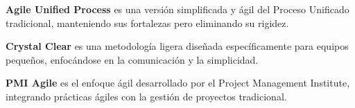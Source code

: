     \textbf{Agile Unified Process} es una versión simplificada y ágil del Proceso Unificado tradicional, manteniendo sus fortalezas pero eliminando su rigidez.

    \textbf{Crystal Clear} es una metodología ligera diseñada específicamente para equipos pequeños, enfocándose en la comunicación y la simplicidad.

    \textbf{PMI Agile} es el enfoque ágil desarrollado por el Project Management Institute, integrando prácticas ágiles con la gestión de proyectos tradicional.





